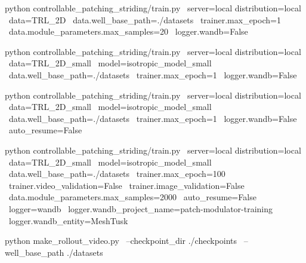 python controllable_patching_striding/train.py \
server=local distribution=local \
data=TRL_2D \
data.well_base_path=./datasets \
trainer.max_epoch=1 \
data.module_parameters.max_samples=20 \
logger.wandb=False


python controllable_patching_striding/train.py \
server=local distribution=local \
data=TRL_2D_small \
model=isotropic_model_small \
data.well_base_path=./datasets \
trainer.max_epoch=1 \
logger.wandb=False


python controllable_patching_striding/train.py \
server=local distribution=local \
data=TRL_2D_small \
model=isotropic_model_small \
data.well_base_path=./datasets \
trainer.max_epoch=1 \
logger.wandb=False \
auto_resume=False



python controllable_patching_striding/train.py \
server=local distribution=local \
data=TRL_2D_small \
model=isotropic_model_small \
data.well_base_path=./datasets \
trainer.max_epoch=100 \
trainer.video_validation=False \
trainer.image_validation=False \
data.module_parameters.max_samples=2000 \
auto_resume=False \
logger=wandb \
logger.wandb_project_name=patch-modulator-training \
logger.wandb_entity=MeshTusk


python make_rollout_video.py \
  --checkpoint_dir ./checkpoints \
  --well_base_path ./datasets